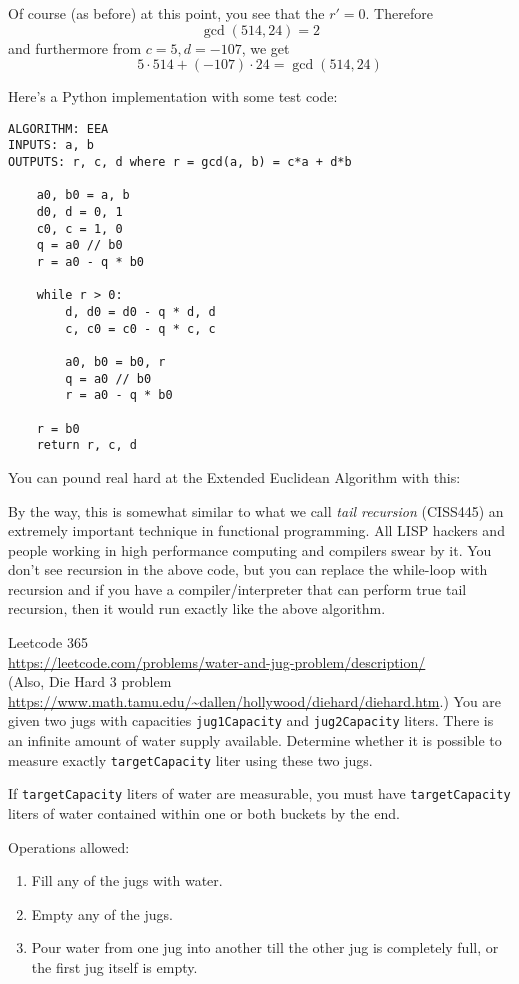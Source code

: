 Of course (as before) at this point, you see that the $r'=0$.
Therefore 
\[
\gcd(514, 24) = 2
\]
and furthermore from $c=5, d=-107$, we get
\[
5 \cdot 514 + (-107) \cdot 24 = \gcd(514, 24) 
\]

Here's a Python implementation with some test code:
\begin{Verbatim}[frame=single, fontsize=\small]
ALGORITHM: EEA
INPUTS: a, b
OUTPUTS: r, c, d where r = gcd(a, b) = c*a + d*b

    a0, b0 = a, b
    d0, d = 0, 1
    c0, c = 1, 0
    q = a0 // b0
    r = a0 - q * b0
    
    while r > 0:
        d, d0 = d0 - q * d, d    
        c, c0 = c0 - q * c, c
    
        a0, b0 = b0, r
        q = a0 // b0
        r = a0 - q * b0

    r = b0
    return r, c, d
\end{Verbatim}
You can pound real hard at the Extended Euclidean Algorithm with this:

By the way, this is somewhat similar to what we call
\textit{tail recursion} (CISS445)
an extremely important technique in functional programming.
All LISP hackers and people working in high performance computing
and compilers swear by it.
You don't see recursion in the above code, but you can 
replace the while-loop with recursion and if
you have a compiler/interpreter that can perform 
true tail recursion, then it would run exactly like the above algorithm.

\begin{ex}
  Leetcode 365 \\
  \url{https://leetcode.com/problems/water-and-jug-problem/description/} \\
  (Also, Die Hard 3 problem
  \url{https://www.math.tamu.edu/~dallen/hollywood/diehard/diehard.htm}.)
  You are given two jugs with capacities \verb!jug1Capacity! and
  \verb!jug2Capacity! liters.
  There is an infinite amount of water supply available.
  Determine whether it is possible to measure exactly \verb!targetCapacity!
  liter using these two jugs.

  If \verb!targetCapacity! liters of water are measurable,
  you must have \verb!targetCapacity! liters of water contained within one or
  both buckets by the end.

  Operations allowed:
  \begin{enumerate}[nosep]
    \item Fill any of the jugs with water.
    \item Empty any of the jugs.
    \item Pour water from one jug into another till the other jug is completely
      full, or the first jug itself is empty.
  \end{enumerate}
  
\end{ex}

